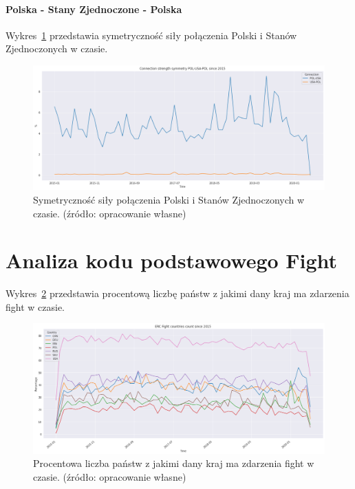 \documentclass[11pt]{report}
\begin{document}
    \paragraph{Polska - Stany Zjednoczone - Polska}

    Wykres~\ref{fig:POL-USA-POL} przedstawia symetryczność siły połączenia Polski i Stanów Zjednoczonych w czasie.


    \begin{figure}[!htp]
        \centering
        \includegraphics[width=1 \textwidth]{fig/ConnectionSymmetry/POL-USA-POL.png}
        \caption{Symetryczność siły połączenia Polski i Stanów Zjednoczonych w czasie. (źródło: opracowanie własne)}
        \label{fig:POL-USA-POL}
    \end{figure}


    \section{Analiza kodu podstawowego Fight}

    Wykres~\ref{fig:Fight} przedstawia procentową liczbę państw z jakimi dany kraj ma zdarzenia fight w czasie.

    \begin{figure}[!htp]
        \centering
        \includegraphics[width=1 \textwidth]{fig/ERC/Fight.png}
        \caption{Procentowa liczba państw z jakimi dany kraj ma zdarzenia fight w czasie. (źródło: opracowanie własne)}
        \label{fig:Fight}
    \end{figure}
\end{document}
